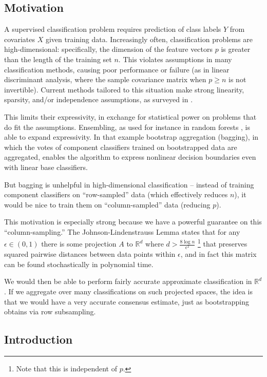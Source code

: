 \documentclass[ejs,preprint]{imsart}
\begin{document}
\subsection{Motivation}

A supervised classification problem requires prediction of class labels $Y$ from covariates $X$ given training data. Increasingly often, classification problems are high-dimensional: specifically, the dimension of the feature vectors $p$ is greater than the length of the training set $n$. This violates assumptions in many classification methods, causing poor performance or failure (as in linear discriminant analysis, where the sample covariance matrix when $p\geq n$ is not invertible). Current methods tailored to this situation make strong linearity, sparsity, and/or independence assumptions, as surveyed in \cite{CS15}.

This limits their expressivity, in exchange for statistical power on problems that do fit the assumptions. Ensembling, as used for instance in random forests \cite{Breiman01}, is able to expand expressivity. In that example bootstrap aggregation (bagging), in which the votes of component classifiers trained on bootstrapped data are aggregated, enables the algorithm to express nonlinear decision boundaries even with linear base classifiers.

But bagging is unhelpful in high-dimensional classification -- instead of training component classifiers on ``row-sampled'' data (which effectively reduces $n$), it would be nice to train them on ``column-sampled'' data (reducing $p$).

This motivation is especially strong because we have a powerful guarantee on this ``column-sampling.'' The Johnson-Lindenstrauss Lemma \cite{DG03} states that for any $\epsilon\in(0,1)$ there is some projection $A$ to $\mathbb R^d$ where $d>\frac{8\log n}{\epsilon^2}$ \footnote{Note that this is independent of $p$.} that preserves squared pairwise distances between data points within $\epsilon$, and in fact this matrix can be found stochastically in polynomial time.

We would then be able to perform fairly accurate approximate classification in $\mathbb R^d$. If we aggregate over many classifications on such projected spaces, the idea is that we would have a very accurate consensus estimate, just as bootstrapping obtains via row subsampling.


\subsection{Introduction}
\end{document}
